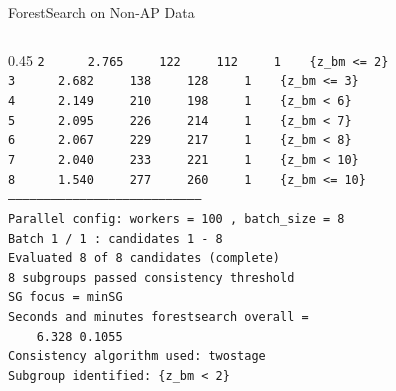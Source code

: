 \documentclass[
  ignorenonframetext,
  aspectratio=169]{beamer}
\begin{document}
\begin{frame}{ForestSearch on Non-AP Data}
\begin{columns}[T]
\begin{column}{0.45\textwidth}
{\texttt{2~~~~~~2.765~~~~~122~~~~~112~~~~~1~~~~\{z\_bm~<=~2\}}\\[-2pt]
\texttt{3~~~~~~2.682~~~~~138~~~~~128~~~~~1~~~~\{z\_bm~<=~3\}}\\[-2pt]
\texttt{4~~~~~~2.149~~~~~210~~~~~198~~~~~1~~~~\{z\_bm~<~6\}}\\[-2pt]
\texttt{5~~~~~~2.095~~~~~226~~~~~214~~~~~1~~~~\{z\_bm~<~7\}}\\[-2pt]
\texttt{6~~~~~~2.067~~~~~229~~~~~217~~~~~1~~~~\{z\_bm~<~8\}}\\[-2pt]
\texttt{7~~~~~~2.040~~~~~233~~~~~221~~~~~1~~~~\{z\_bm~<~10\}}\\[-2pt]
\texttt{8~~~~~~1.540~~~~~277~~~~~260~~~~~1~~~~\{z\_bm~<=~10\}}\\[-2pt]
\texttt{--------------------------------------------------------------------------------}\\[-2pt]
\vspace{2pt}
\texttt{Parallel~config:~workers~=~100~,~batch\_size~=~8}\\[-2pt]
\texttt{Batch~1~/~1~:~candidates~1~-~8}\\[-2pt]
\texttt{Evaluated~8~of~8~candidates~(complete)}\\[-2pt]
\texttt{8~subgroups~passed~consistency~threshold}\\[-2pt]
\texttt{SG~focus~=~minSG}\\[-2pt]
\texttt{Seconds~and~minutes~forestsearch~overall~=~}\\[-2pt]
\texttt{~~~~6.328~0.1055}\\[-2pt]
\texttt{Consistency~algorithm~used:~twostage}\\[-2pt]
\texttt{Subgroup~identified:~\{z\_bm~<~2\}}\\[-2pt]
}
\end{column}
\end{columns}

\normalsize
\end{frame}
\end{document}
